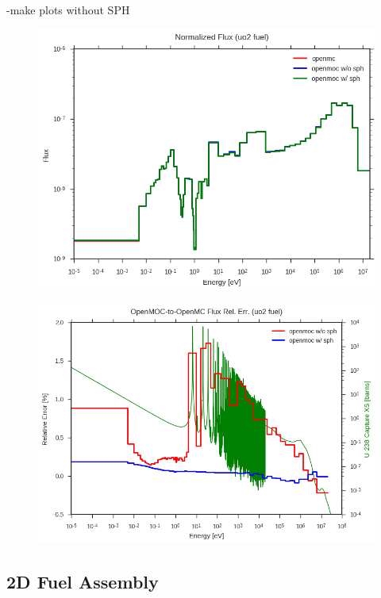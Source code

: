 -make plots without SPH\\

\begin{figure}[h!]
  \centering
  \includegraphics[width=0.9\linewidth]{figures/biases/pin-cell/flux-uo2-fuel}
  \caption{}
\label{fig:chap2-pin-flux}
\end{figure}

\begin{figure}[h!]
  \centering
  \includegraphics[width=0.9\linewidth]{figures/biases/pin-cell/rel-err-uo2-fuel}
  \caption{}
\label{fig:chap2-pin-flux}
\end{figure}


\subsection{2D Fuel Assembly}

